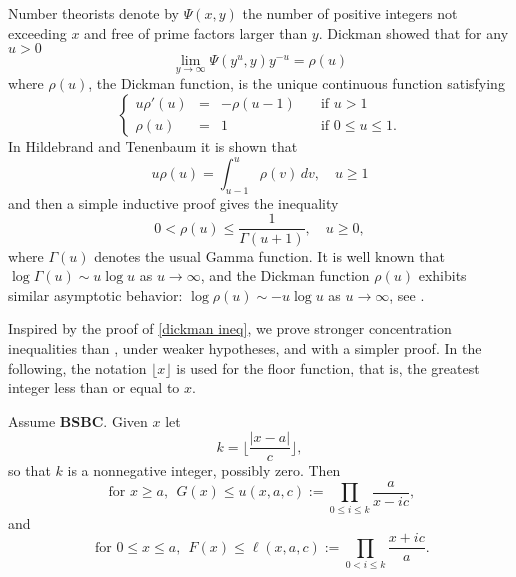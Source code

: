 \documentclass[smallextended,envcountsect]{svjour3}
\begin{document}
Number theorists denote by
   $
   \Psi(x,y)
   $
the number of positive integers not exceeding $x$ and free of prime factors larger than $y$.  Dickman \cite{dickman} showed that for any $u > 0$
   $$
   \lim_{y \to \infty} \Psi(y^u,y) y^{-u} = \rho(u)
   $$
where $\rho(u)$, the Dickman function, is the unique continuous function satisfying
    $$
    \left\{ \begin{array}{rcll}
              u\rho'(u) & = & -\rho(u-1) & \quad \mbox{if }u > 1 \\
              \rho(u)  & =  & 1 & \quad  \mbox{if }0 \le u \le 1.
              \end{array} \right.
              $$
In Hildebrand and Tenenbaum \cite[Lemma 2.5]{HT93}
it is shown that
       $$ 
         u \rho(u) = \int_{u-1}^u \rho(v)\,dv, \quad  u \ge 1
       $$ 
and then a simple inductive proof gives the inequality
         \begin{equation} \label{dickman ineq}
         0 < \rho(u) \le \frac{1}{\Gamma(u+1)}, \quad u \ge 0,
         \end{equation}
where $\Gamma(u)$ denotes the usual Gamma function.  It is well known that $\log \Gamma(u) \sim u \log u$ as $u \to \infty$, and the Dickman function $\rho(u)$ exhibits similar asymptotic behavior: $\log \rho(u) \sim -u \log u$ as $u \to \infty$, see \cite[Cor 2.3]{HT93}.

Inspired by the proof of \eqref{dickman ineq}, we prove stronger concentration inequalities than \cite{GhoshGold}, under weaker hypotheses, and with a simpler proof.  In the following, the notation $\lfloor x \rfloor$ is used for the floor function, that is, the greatest integer less than or equal to $x$.

\begin{theorem}\label{simple thm}
Assume {\bf BSBC}.  Given $x$ let
\begin{equation}\label{def k}
   k  = \lfloor \frac{| x-a|}{c} \rfloor,
\end{equation}
so that $k$ is a nonnegative integer, possibly zero.
Then
\begin{equation}\label{upper}
\text{ for } x\ge a, \ \      G(x) \le u(x,a,c) := \prod_{0 \le i \le k} \frac{a}{x-ic},
\end{equation}
and
\begin{equation}\label{lower}
\text{ for } 0 \le x \le a, \ \    F(x) \le \ell(x,a,c) := \prod_{0 < i \le k} \frac{x+ic}{a}.
\end{equation}
\end{theorem}
\end{document}
